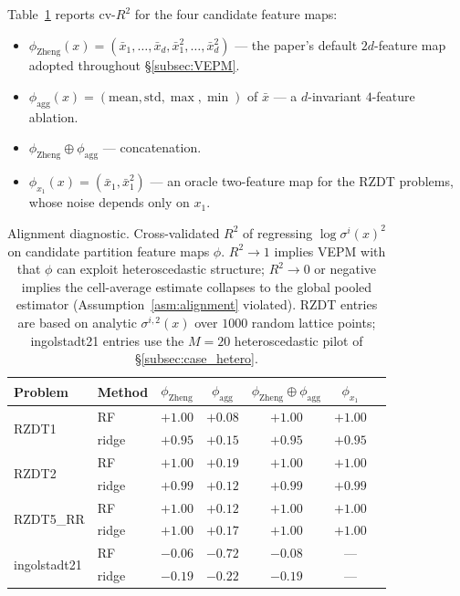 Table~\ref{tab:alignment} reports cv-$R^{2}$ for the four candidate
feature maps:
\begin{itemize}
  \item $\phi_{\mathrm{Zheng}}(x) = (\bar x_1,\ldots,\bar x_d,\bar x_1^2,\ldots,\bar x_d^2)$ —
    the paper's default $2d$-feature map adopted throughout \S\ref{subsec:VEPM}.
  \item $\phi_{\mathrm{agg}}(x) = (\mathrm{mean},\mathrm{std},\max,\min)$
    of $\bar x$ — a $d$-invariant $4$-feature ablation.
  \item $\phi_{\mathrm{Zheng}}\oplus\phi_{\mathrm{agg}}$ — concatenation.
  \item $\phi_{x_1}(x) = (\bar x_1,\bar x_1^{2})$ — an oracle two-feature
    map for the RZDT problems, whose noise depends only on $x_1$.
\end{itemize}

\begin{table}[t]
  \centering
  \caption{Alignment diagnostic.  Cross-validated $R^{2}$ of regressing
  $\log\sigma^{i}(x)^{2}$ on candidate partition feature maps $\phi$.
  $R^{2}\to 1$ implies VEPM with that $\phi$ can exploit heteroscedastic
  structure; $R^{2}\to 0$ or negative implies the cell-average estimate
  collapses to the global pooled estimator (Assumption~\ref{asm:alignment}
  violated).  RZDT entries are based on analytic $\sigma^{i,2}(x)$ over
  $1000$ random lattice points; ingolstadt21 entries use the
  $M=20$ heteroscedastic pilot of \S\ref{subsec:case_hetero}.}
  \label{tab:alignment}
  \small
  \begin{tabular}{l l c c c c c}
    \toprule
    Problem & Method & $\phi_{\mathrm{Zheng}}$ & $\phi_{\mathrm{agg}}$ &
        $\phi_{\mathrm{Zheng}}\oplus\phi_{\mathrm{agg}}$ & $\phi_{x_1}$ \\
    \midrule
    \multirow{2}{*}{RZDT1}    & RF    & $+1.00$ & $+0.08$ & $+1.00$ & $+1.00$ \\
                              & ridge & $+0.95$ & $+0.15$ & $+0.95$ & $+0.95$ \\
    \multirow{2}{*}{RZDT2}    & RF    & $+1.00$ & $+0.19$ & $+1.00$ & $+1.00$ \\
                              & ridge & $+0.99$ & $+0.12$ & $+0.99$ & $+0.99$ \\
    \multirow{2}{*}{RZDT5\_RR}& RF    & $+1.00$ & $+0.12$ & $+1.00$ & $+1.00$ \\
                              & ridge & $+1.00$ & $+0.17$ & $+1.00$ & $+1.00$ \\
    \midrule
    \multirow{2}{*}{ingolstadt21} & RF    & $-0.06$ & $-0.72$ & $-0.08$ & --- \\
                                  & ridge & $-0.19$ & $-0.22$ & $-0.19$ & --- \\
    \bottomrule
  \end{tabular}
\end{table}

